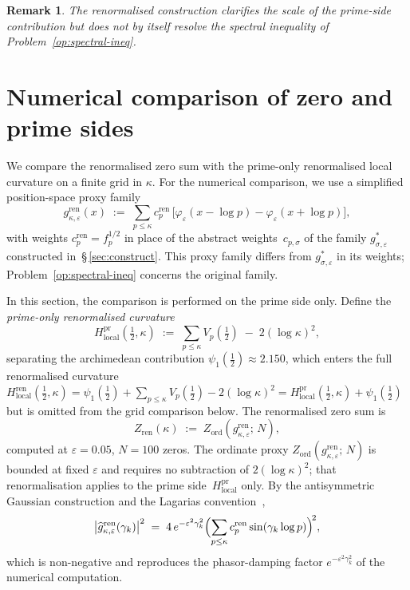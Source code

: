 \documentclass[11pt]{article}
\newtheorem*{remark}{Remark}
\newcommand{\Hlocal}{H_{\mathrm{local}}}
\newcommand{\Hren}{H_{\mathrm{local}}^{\mathrm{ren}}}
\newcommand{\cren}{c_p^{\mathrm{ren}}}
\newcommand{\Zren}{Z_{\mathrm{ren}}}
\begin{document}
\begin{remark}
The renormalised construction clarifies the scale of the
prime-side contribution but does not by itself resolve the
spectral inequality of Problem~\ref{op:spectral-ineq}.
\end{remark}

\section{Numerical comparison of zero and prime sides}
\label{sec:numerical}

We compare the renormalised zero sum with the
prime-only renormalised local curvature on a finite grid in
$\kappa$.
For the numerical comparison, we use a simplified
position-space proxy family
\[
g^{\mathrm{ren}}_{\kappa,\varepsilon}(x)
\;:=\; \sum_{p\le\kappa} \cren\,
\bigl[\varphi_\varepsilon(x-\log p)
      -\varphi_\varepsilon(x+\log p)\bigr],
\]
with weights $\cren=f_p^{1/2}$ in place of the abstract
weights~$c_{p,\sigma}$ of the family
$g^*_{\sigma,\varepsilon}$ constructed
in~\S\,\ref{sec:construct}.
This proxy family differs from $g^*_{\sigma,\varepsilon}$
in its weights; Problem~\ref{op:spectral-ineq} concerns the
original family.

In this section, the comparison is performed on the prime side
only.  Define the \emph{prime-only renormalised curvature}
\[
\Hlocal^{\mathrm{pr}}(\tfrac12,\kappa)
\;:=\; \sum_{p\le\kappa} V_p(\tfrac12) \;-\; 2(\log\kappa)^2,
\]
separating the archimedean contribution
$\psi_1(\tfrac12)\approx 2.150$, which enters the full
renormalised curvature $\Hren(\tfrac12,\kappa) =
\psi_1(\tfrac12) + \sum_{p\le\kappa}V_p(\tfrac12)
- 2(\log\kappa)^2 = \Hlocal^{\mathrm{pr}}(\tfrac12,\kappa)
+ \psi_1(\tfrac12)$
but is omitted from the grid comparison below.
The renormalised zero sum is
\[
\Zren(\kappa)
\;:=\; Z_{\mathrm{ord}}(g^{\mathrm{ren}}_{\kappa,\varepsilon};\,N),
\]
computed at $\varepsilon=0.05$, $N=100$ zeros.
The ordinate proxy
$Z_{\mathrm{ord}}(g^{\mathrm{ren}}_{\kappa,\varepsilon};\,N)$
is bounded at fixed
$\varepsilon$ and requires no subtraction of $2(\log\kappa)^2$;
that renormalisation applies to the prime
side~$\Hlocal^{\mathrm{pr}}$ only.
By the antisymmetric Gaussian construction and the Lagarias
convention~\cite{Lagarias},
\begin{equation}\label{eq:Zren-fourier}
\bigl|\widehat g^{\mathrm{ren}}_{\kappa,\varepsilon}
(\gamma_k)\bigr|^2
\;=\; 4\,e^{-\varepsilon^2\gamma_k^2}
\Bigl(\sum_{p\le\kappa}
\cren\sin(\gamma_k\log p)\Bigr)^{\!2},
\end{equation}
which is non-negative and reproduces the phasor-damping
factor $e^{-\varepsilon^2\gamma_k^2}$ of the numerical
computation.
\end{document}
